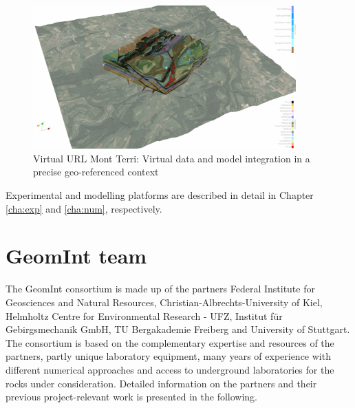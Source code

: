\begin{figure}[ht!]
\centering
\includegraphics[width=0.9\textwidth]{figures/mt-surface+move.png}
\caption{Virtual URL Mont Terri: Virtual data and model integration in a precise geo-referenced context}
\label{fig:vr-url}
\end{figure}

Experimental and modelling platforms are described in detail in Chapter \ref{cha:exp} and \ref{cha:num}, respectively.

\clearpage
\section{GeomInt team}
\label{sec:team}

The GeomInt consortium is made up of the partners Federal Institute for Geosciences and Natural Resources, Christian-Albrechts-University of Kiel, Helmholtz Centre for Environmental Research - UFZ, Institut f\"ur Gebirgs\-mechanik GmbH, TU Bergakademie Freiberg and University of Stuttgart. The consortium is based on the complementary expertise and resources of the partners, partly unique laboratory equipment, many years of experience with different numerical approaches and access to underground laboratories for the rocks under consideration. Detailed information on the partners and their previous project-relevant work is presented in the following.

